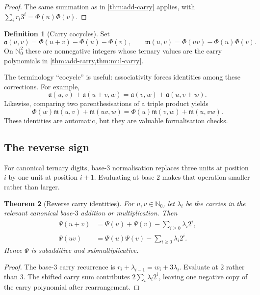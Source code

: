 \documentclass[11pt]{article}
\newtheorem{theorem}{Theorem}[section]
\theoremstyle{definition}
\newtheorem{definition}[theorem]{Definition}
\theoremstyle{remark}
\newcommand{\Nzero}{\mathbb N_0}
\newcommand{\PhiMap}{\Phi}
\newcommand{\PsiMap}{\Psi}
\begin{document}
\begin{proof}
The same summation as in \cref{thm:add-carry} applies, with
$\sum_i r_i3^i=\PhiMap(u)\PhiMap(v)$.
\end{proof}

\begin{definition}[Carry cocycles]
Set
\[
 \mathfrak a(u,v)=\PhiMap(u+v)-\PhiMap(u)-\PhiMap(v),
 \qquad
 \mathfrak m(u,v)=\PhiMap(uv)-\PhiMap(u)\PhiMap(v).
\]
On $\Nzero^2$ these are nonnegative integers whose ternary values are the
carry polynomials in \cref{thm:add-carry,thm:mul-carry}.
\end{definition}

The terminology ``cocycle'' is useful: associativity forces identities among
these corrections.  For example,
\[
 \mathfrak a(u,v)+\mathfrak a(u+v,w)
 =\mathfrak a(v,w)+\mathfrak a(u,v+w).
\]
Likewise, comparing two parenthesisations of a triple product yields
\[
 \PhiMap(w)\mathfrak m(u,v)+\mathfrak m(uv,w)
 =\PhiMap(u)\mathfrak m(v,w)+\mathfrak m(u,vw).
\]
These identities are automatic, but they are valuable formalisation checks.

\subsection{The reverse sign}

For canonical ternary digits, base-$3$ normalisation replaces three units at
position $i$ by one unit at position $i+1$.  Evaluating at base $2$ makes that
operation smaller rather than larger.

\begin{theorem}[Reverse carry identities]\label{thm:reverse-carry}
For $u,v\in\Nzero$, let $\lambda_i$ be the carries in the relevant canonical
base-$3$ addition or multiplication.  Then
\begin{align*}
 \PsiMap(u+v)
   &=\PsiMap(u)+\PsiMap(v)-\sum_{i\ge0}\lambda_i2^i,\\
 \PsiMap(uv)
   &=\PsiMap(u)\PsiMap(v)-\sum_{i\ge0}\lambda_i2^i.
\end{align*}
Hence $\PsiMap$ is subadditive and submultiplicative.
\end{theorem}

\begin{proof}
The base-$3$ carry recurrence is
$r_i+\lambda_{i-1}=w_i+3\lambda_i$.  Evaluate at $2$ rather than $3$.
The shifted carry sum contributes $2\sum_i\lambda_i2^i$, leaving one negative
copy of the carry polynomial after rearrangement.
\end{proof}
\end{document}
